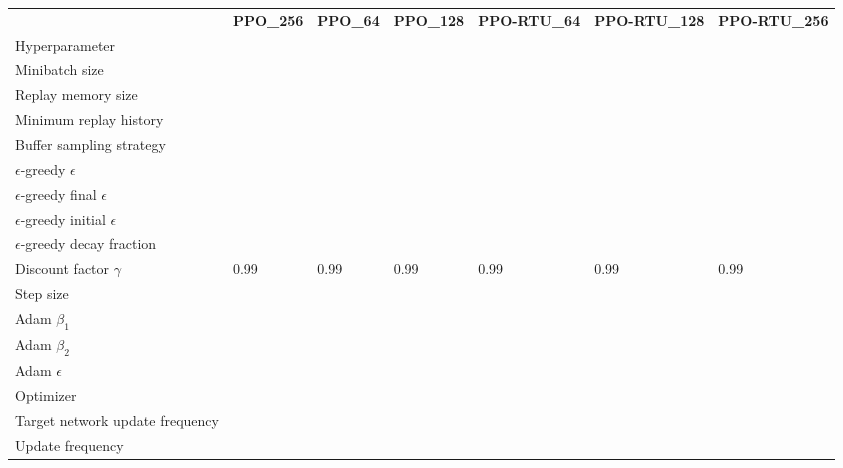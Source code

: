 \begin{tabular}{lllllll}
 & \bfseries PPO_256 & \bfseries PPO_64 & \bfseries PPO_128 & \bfseries PPO-RTU_64 & \bfseries PPO-RTU_128 & \bfseries PPO-RTU_256 \\
Hyperparameter &  &  &  &  &  &  \\
Minibatch size &  &  &  &  &  &  \\
Replay memory size &  &  &  &  &  &  \\
Minimum replay history &  &  &  &  &  &  \\
Buffer sampling strategy &  &  &  &  &  &  \\
$\epsilon$-greedy $\epsilon$ &  &  &  &  &  &  \\
$\epsilon$-greedy final $\epsilon$ &  &  &  &  &  &  \\
$\epsilon$-greedy initial $\epsilon$ &  &  &  &  &  &  \\
$\epsilon$-greedy decay fraction &  &  &  &  &  &  \\
Discount factor $\gamma$ & 0.99 & 0.99 & 0.99 & 0.99 & 0.99 & 0.99 \\
Step size &  &  &  &  &  &  \\
Adam $\beta_1$ &  &  &  &  &  &  \\
Adam $\beta_2$ &  &  &  &  &  &  \\
Adam $\epsilon$ &  &  &  &  &  &  \\
Optimizer &  &  &  &  &  &  \\
Target network update frequency &  &  &  &  &  &  \\
Update frequency &  &  &  &  &  &  \\
\end{tabular}
